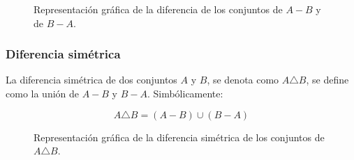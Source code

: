 \begin{figure}[h]
    \centering
    \begin{subfigure}[b]{0.45\textwidth}
        \centering
    \end{subfigure}
\hfill
    \begin{subfigure}[b]{0.45\textwidth}
        \centering
\end{subfigure}
\caption{Representación gráfica de la diferencia de los conjuntos de $A-B$ y de $B-A$.}
\label{fig:diferenciaConjuntos}
\end{figure}

\subsubsection{Diferencia simétrica}
La diferencia simétrica de dos conjuntos $A$ y $B$, se denota como $A \triangle
B$, se define como la unión de $A-B$ y $B-A$. Simbólicamente:

\begin{equation}
    A \triangle B = (A-B) \cup (B-A)
\end{equation}


\begin{figure}[h]
    \centering
    \caption{Representación gráfica de la diferencia simétrica de los conjuntos de $A \triangle B$.}
    \label{fig:diferenciaSimetricaConjuntos}
\end{figure}

